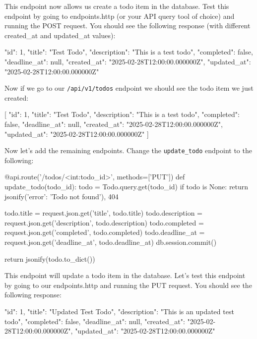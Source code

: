 \documentclass{csse4400}
\begin{document}
This endpoint now allows us create a todo item in the database.
Test this endpoint by going to endpoints.http (or your API query tool of choice) and running the POST request.
You should see the following response (with different created\_at and updated\_at values):

\begin{code}[language=json,numbers=none]{}
  {
    "id": 1,
    "title": "Test Todo",
    "description": "This is a test todo",
    "completed": false,
    "deadline_at": null,
    "created_at": "2025-02-28T12:00:00.000000Z",
    "updated_at": "2025-02-28T12:00:00.000000Z"
  }
\end{code}

Now if we go to our \texttt{/api/v1/todos} endpoint we should see the todo item we just created:

\begin{code}[language=json,numbers=none]{}
  [
    {
      "id": 1,
      "title": "Test Todo",
      "description": "This is a test todo",
      "completed": false,
      "deadline_at": null,
      "created_at": "2025-02-28T12:00:00.000000Z",
      "updated_at": "2025-02-28T12:00:00.000000Z"
    }
  ]
\end{code}

Now let's add the remaining endpoints.
Change the \texttt{update\_todo} endpoint to the following:

\begin{code}[language=python,numbers=none]{}
@api.route('/todos/<int:todo_id>', methods=['PUT'])
def update_todo(todo_id):
    todo = Todo.query.get(todo_id)
    if todo is None:
        return jsonify({'error': 'Todo not found'}), 404

    todo.title = request.json.get('title', todo.title)
    todo.description = request.json.get('description', todo.description)
    todo.completed = request.json.get('completed', todo.completed)
    todo.deadline_at = request.json.get('deadline_at', todo.deadline_at)
    db.session.commit()

    return jsonify(todo.to_dict())
\end{code}

This endpoint will update a todo item in the database.
Let's test this endpoint by going to our endpoints.http and running the PUT request.
You should see the following response:

\begin{code}[language=json,numbers=none]{}
  {
    "id": 1,
    "title": "Updated Test Todo",
    "description": "This is an updated test todo",
    "completed": false,
    "deadline_at": null,
    "created_at": "2025-02-28T12:00:00.000000Z",
    "updated_at": "2025-02-28T12:00:00.000000Z"
  }

\end{code}
\end{document}
